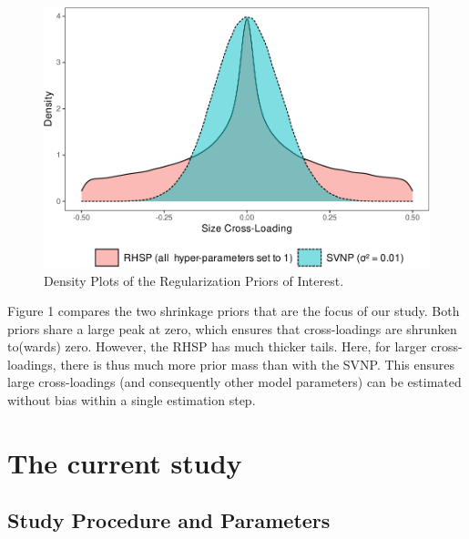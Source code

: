 \documentclass[
  man, donotrepeattitle,floatsintext]{apa6}
\begin{document}
\begin{figure}
\centering
\includegraphics{JMBKoch_thesis_files/figure-latex/unnamed-chunk-1-1.pdf}
\caption{\label{fig:unnamed-chunk-1}Density Plots of the Regularization Priors of Interest.}
\end{figure}

Figure 1 compares the two shrinkage priors that are the focus of our study. Both priors share a large peak at zero, which ensures that cross-loadings are shrunken to(wards) zero. However, the RHSP has much thicker tails. Here, for larger cross-loadings, there is thus much more prior mass than with the SVNP. This ensures large cross-loadings (and consequently other model parameters) can be estimated without bias within a single estimation step.

\hypertarget{the-current-study}{%
\section{The current study}\label{the-current-study}}

\hypertarget{study-procedure-and-parameters}{%
\subsection{Study Procedure and Parameters}\label{study-procedure-and-parameters}}
\end{document}
